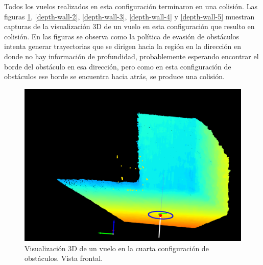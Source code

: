 Todos los vuelos realizados en esta configuración terminaron en una colisión. Las figuras \ref{depth-wall-1}, \ref{depth-wall-2}, \ref{depth-wall-3}, \ref{depth-wall-4} y \ref{depth-wall-5} muestran capturas de la visualización 3D de un vuelo en esta configuración que resulto en colisión. En las figuras se observa como la política de evasión de obstáculos intenta generar trayectorias que se dirigen hacia la región en la dirección  en donde no hay información de profundidad, probablemente esperando encontrar el borde del obstáculo en esa dirección, pero como en esta configuración de obstáculos ese borde se encuentra hacia atrás, se produce una colisión.

\begin{figure}[H]
    \centering
    \includegraphics[scale=0.23]{partes/ImgJoao/depth-wall-1-front.png}
    \caption[Visualización 3D de un vuelo en la cuarta configuración de obstáculos. Vista frontal.]{Visualización 3D de un vuelo en la cuarta configuración de obstáculos. Vista frontal.}
    \label{depth-wall-1}
\end{figure}

